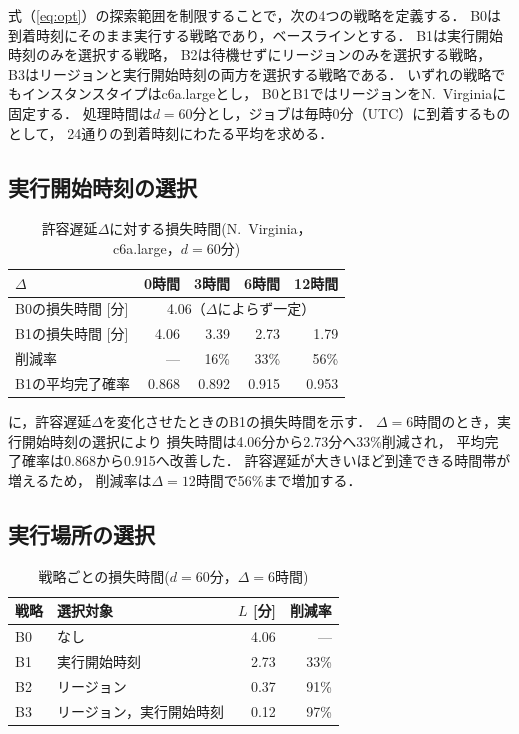 \documentclass[submit,techrep,noauthor]{ipsj}
\begin{document}
式（\ref{eq:opt}）の探索範囲を制限することで，次の4つの戦略を定義する．
B0は到着時刻にそのまま実行する戦略であり，ベースラインとする．
B1は実行開始時刻のみを選択する戦略，
B2は待機せずにリージョンのみを選択する戦略，
B3はリージョンと実行開始時刻の両方を選択する戦略である．
いずれの戦略でもインスタンスタイプはc6a.largeとし，
B0とB1ではリージョンをN.~Virginiaに固定する．
処理時間は$d=60$分とし，ジョブは毎時0分（UTC）に到着するものとして，
24通りの到着時刻にわたる平均を求める．

\subsection{実行開始時刻の選択}
\label{sec:b1}

\begin{table}[tb]
\caption{許容遅延$\Delta$に対する損失時間(N.~Virginia，c6a.large，$d=60$分)}
\label{tab:b1}
\centering
\begin{tabular}{lrrrr}\hline\hline
$\Delta$ & 0時間 & 3時間 & 6時間 & 12時間\\\hline
B0の損失時間 [分]  & \multicolumn{4}{c}{4.06（$\Delta$によらず一定）}\\
B1の損失時間 [分]  & 4.06 & 3.39 & 2.73 & 1.79\\
削減率             & ---  & 16\% & 33\% & 56\%\\
B1の平均完了確率   & 0.868 & 0.892 & 0.915 & 0.953\\\hline
\end{tabular}
\end{table}

に，許容遅延$\Delta$を変化させたときのB1の損失時間を示す．
$\Delta=6$時間のとき，実行開始時刻の選択により
損失時間は4.06分から2.73分へ33\%削減され，
平均完了確率は0.868から0.915へ改善した．
許容遅延が大きいほど到達できる時間帯が増えるため，
削減率は$\Delta=12$時間で56\%まで増加する．

\subsection{実行場所の選択}
\label{sec:location}

\begin{table}[tb]
\caption{戦略ごとの損失時間($d=60$分，$\Delta=6$時間)}
\label{tab:strategies}
\centering
\begin{tabular}{llrr}\hline\hline
戦略 & 選択対象 & $L$ [分] & 削減率\\\hline
B0 & なし                     & 4.06 & ---\\
B1 & 実行開始時刻             & 2.73 & 33\%\\
B2 & リージョン               & 0.37 & 91\%\\
B3 & リージョン，実行開始時刻 & 0.12 & 97\%\\\hline
\end{tabular}
\end{table}
\end{document}
